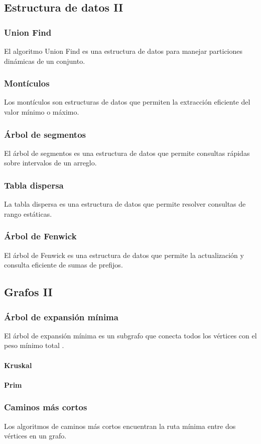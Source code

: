 \subsection{Estructura de datos II}
\subsubsection{Union Find}
El algoritmo Union Find es una estructura de datos para manejar particiones dinámicas de un conjunto.
\subsubsection{Montículos}
Los montículos son estructuras de datos que permiten la extracción eficiente del valor mínimo o máximo.
\subsubsection{Árbol de segmentos}
El árbol de segmentos es una estructura de datos que permite consultas rápidas sobre intervalos de un arreglo.
\subsubsection{Tabla dispersa}
La tabla dispersa es una estructura de datos que permite resolver consultas de rango estáticas.
\subsubsection{Árbol de Fenwick}
El árbol de Fenwick es una estructura de datos que permite la actualización y consulta eficiente de sumas de prefijos.

\subsection{Grafos II}
\subsubsection{Árbol de expansión mínima}
El árbol de expansión mínima es un subgrafo que conecta todos los vértices con el peso mínimo total \cite{skiena2008algorithm}.
\paragraph{Kruskal}
\paragraph{Prim}
\subsubsection{Caminos más cortos}
Los algoritmos de caminos más cortos encuentran la ruta mínima entre dos vértices en un grafo.
